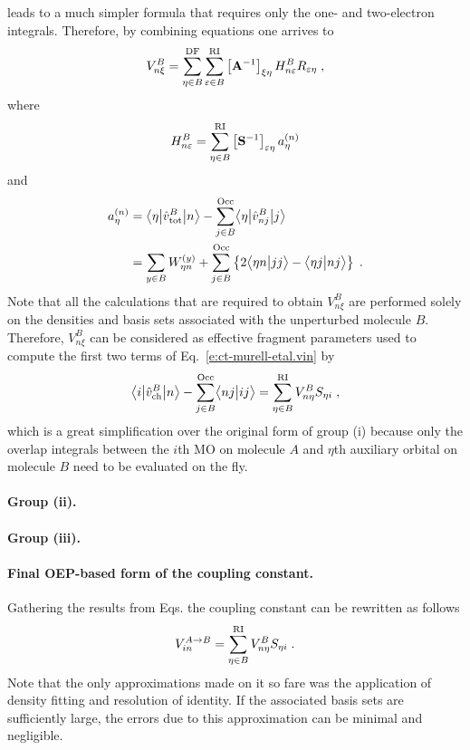 %
leads to a much simpler formula
that requires only the one- and two\hyp{}electron integrals. 
Therefore, by combining
equations %
one arrives to
%
\begin{equation}
 V^B_{n\xi} = \sum_{\eta\in B}^{\rm DF} 
          \sum_{\varepsilon\in B}^{\rm RI}
         \left[ {\bf A}^{-1} \right]_{\xi\eta}
         H_{n\varepsilon}^B R_{\varepsilon \eta} \;,
\end{equation}
%
where
%
\begin{equation}
 H_{n\varepsilon}^B = \sum_{\eta\in B}^{\rm RI} \left[ {\bf S}^{-1} \right]_{\varepsilon\eta}
   a_\eta^{(n)}
\end{equation}
%
and
\begin{align}
 a^{(n)}_\eta &= \bigl\langle {\eta} \bigl\lvert {\hat{v}^B_{\rm tot}} \bigl\lvert {n} \bigr\rangle
      - \sum_{j\in B}^{\rm Occ} \bigl\langle {\eta} \bigl\lvert {\hat{v}^B_{nj}} \bigl\lvert {j} \bigr\rangle \nonumber \\
 &= \sum_{y\in B} W^{(y)}_{\eta n} 
  + \sum_{j\in B}^{\rm Occ} 
  \left\{
   2\bigl\langle {\eta n} \bigl\lvert {jj} \bigr\rangle - \bigl\langle {\eta j} \bigl\lvert {nj} \bigr\rangle 
  \right\} \;.
\end{align}
%
Note that all the calculations that are required to obtain $V^B_{n\xi}$ are performed
solely on the densities and basis sets associated with the unperturbed molecule $B$.
Therefore, $V^B_{n\xi}$ can be considered as effective fragment parameters
used to compute the first two terms of Eq.~\eqref{e:ct-murell-etal.vin} by
%
\begin{equation}
        \bigl\langle {i} \bigl\lvert {\hat{v}^B_{\rm ch} } \bigl\lvert {n} \bigr\rangle 
      - \sum_{j\in B}^{\rm Occ} \bigl\langle {nj} \bigl\lvert {ij} \bigr\rangle 
       = \sum_{\eta\in B}^{\rm RI} V^B_{n\eta} S_{\eta i} \;,
\end{equation}
%
which is a great simplification over the original form of group (i)
because only the overlap integrals between the $i$th MO on molecule $A$
and $\eta$th auxiliary orbital on molecule $B$ need to be evaluated on the fly.

\paragraph{Group (ii).}
\paragraph{Group (iii).}
\paragraph{Final OEP-based form of the coupling constant.}
Gathering the results from Eqs. the coupling constant
can be rewritten as follows
%
\begin{equation} \label{e:ct-murell-etal.vin.oep}
 V_{in}^{A\rightarrow B}
       = \sum_{\eta\in B}^{\rm RI} V^B_{n\eta} S_{\eta i} \;.
\end{equation}
%
Note that the only approximations made on it so fare was the application of density fitting
and resolution of identity. If the associated basis sets are sufficiently large, the errors
due to this approximation can be minimal and negligible.

